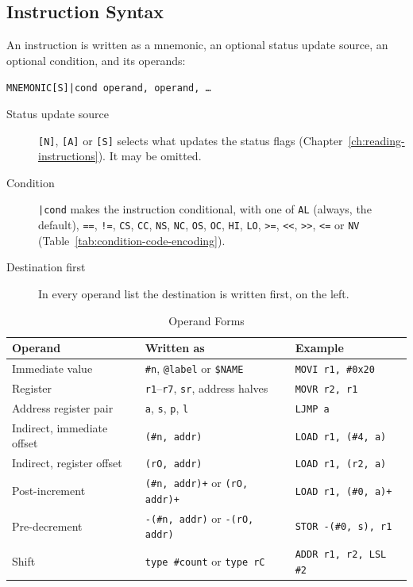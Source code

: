 \subsection*{Instruction Syntax}

An instruction is written as a mnemonic, an optional status update source, an optional condition, and its operands:

\begin{center}
	\texttt{MNEMONIC[S]|cond operand, operand, \ldots}
\end{center}

\begin{description}
	\item[Status update source] \texttt{[N]}, \texttt{[A]} or \texttt{[S]} selects what updates the status flags
	      (Chapter~\ref{ch:reading-instructions}). It may be omitted.
	\item[Condition] \texttt{|cond} makes the instruction conditional, with one of \texttt{AL} (always, the default),
	      \texttt{==}, \texttt{!=}, \texttt{CS}, \texttt{CC}, \texttt{NS}, \texttt{NC}, \texttt{OS}, \texttt{OC}, \texttt{HI},
	      \texttt{LO}, \texttt{>=}, \texttt{<<}, \texttt{>>}, \texttt{<=} or \texttt{NV}
	      (Table~\ref{tab:condition-code-encoding}).
	\item[Destination first] In every operand list the destination is written first, on the left.
\end{description}

\begin{table}[H]
	\centering
	\begin{tabular}{lll}
		\toprule
		\textbf{Operand}           & \textbf{Written as}                                   & \textbf{Example}              \\
		\midrule
		Immediate value            & \texttt{\#n}, \texttt{@label} or \texttt{\$NAME}      & \texttt{MOVI r1, \#0x20}      \\
		Register                   & \texttt{r1}--\texttt{r7}, \texttt{sr}, address halves & \texttt{MOVR r2, r1}          \\
		Address register pair      & \texttt{a}, \texttt{s}, \texttt{p}, \texttt{l}        & \texttt{LJMP a}               \\
		Indirect, immediate offset & \texttt{(\#n, addr)}                                  & \texttt{LOAD r1, (\#4, a)}    \\
		Indirect, register offset  & \texttt{(rO, addr)}                                   & \texttt{LOAD r1, (r2, a)}     \\
		Post-increment             & \texttt{(\#n, addr)+} or \texttt{(rO, addr)+}         & \texttt{LOAD r1, (\#0, a)+}   \\
		Pre-decrement              & \texttt{-(\#n, addr)} or \texttt{-(rO, addr)}         & \texttt{STOR -(\#0, s), r1}   \\
		Shift                      & \texttt{type \#count} or \texttt{type rC}             & \texttt{ADDR r1, r2, LSL \#2} \\
		\bottomrule
	\end{tabular}
	\caption{Operand Forms}
	\label{tab:assembly-operand-forms}
\end{table}

